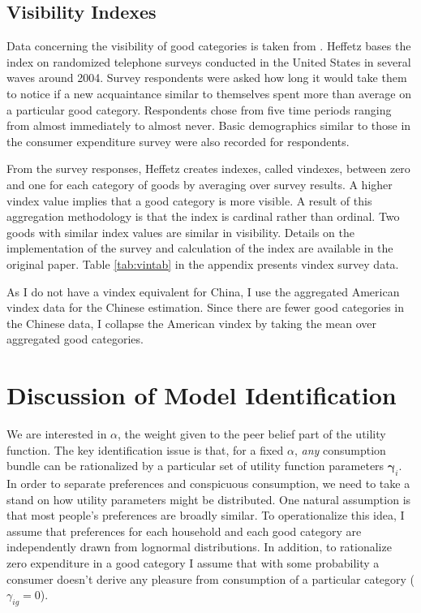 \documentclass[12pt]{article}
\begin{document}
\subsection{Visibility Indexes}
Data concerning the visibility of good categories is taken from \citet{Heffetz2011}.  
Heffetz bases the index on randomized telephone surveys conducted in the United States in several waves around 2004.
Survey respondents were asked how long it would take them to notice if a new acquaintance similar to themselves spent more than average on a particular good category.
Respondents chose from five time periods ranging from almost immediately to almost never.
Basic demographics similar to those in the consumer expenditure survey were also recorded for respondents.

From the survey responses, Heffetz creates indexes, called vindexes, between zero and one for each category of goods by averaging over survey results. 
A higher vindex value implies that a good category is more visible. 
A result of this aggregation methodology is that the index is cardinal rather than ordinal.  Two goods with similar index values are similar in visibility.  Details on the implementation of the survey and calculation of the index are available in the original paper.
Table \ref{tab:vintab} in the appendix presents vindex survey data.

As I do not have a vindex equivalent for China, I use the aggregated American vindex data for the Chinese estimation. Since there are fewer good categories in the Chinese data, I collapse the American vindex by taking the mean over aggregated good categories.

\section{Discussion of Model Identification}

We are interested in $\alpha$, the weight given to the peer belief part of the utility function.  The key identification issue is that, for a fixed $\alpha$, \emph{any} consumption bundle can be rationalized by a particular set of utility function parameters $\boldsymbol{\gamma}_i$.  In order to separate preferences and conspicuous consumption, we need to take a stand on how utility parameters might be distributed.  One natural assumption is that most people's preferences are broadly similar.  To operationalize this idea, I assume that preferences for each household and each good category are independently drawn from lognormal distributions.  In addition, to rationalize zero expenditure in a good category I assume that with some probability a consumer doesn't derive any pleasure from consumption of a particular category ($\gamma_{ig} = 0$).
\end{document}
